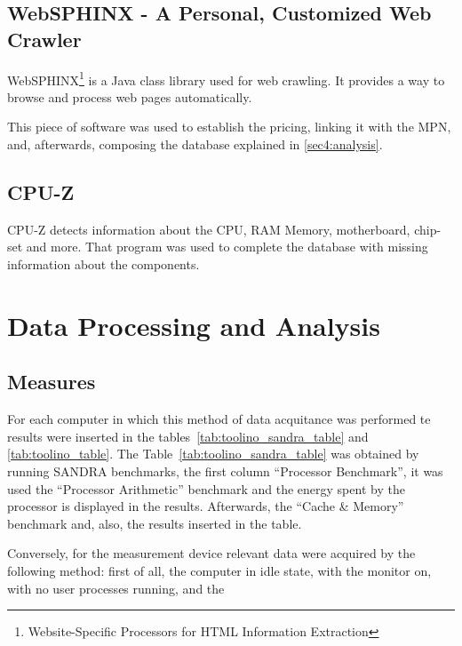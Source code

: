         
    
    \subsection{WebSPHINX - A Personal, Customized Web Crawler} \label{sec3:websphinx}
        WebSPHINX\footnote{Website-Specific Processors for HTML Information Extraction} is a Java class library used for web crawling. It provides a way to browse and process web pages automatically.
        
        This piece of software was used to establish the pricing, linking it with the MPN, and, afterwards, composing the database explained in \ref{sec4:analysis}. 
    
    \subsection{CPU-Z} \label{sec3:cpu-z}
        CPU-Z detects information about the CPU, RAM Memory, motherboard, chip-set and more. That program was used to complete the database with missing information about the components.

\section{Data Processing and Analysis} \label{sec3:data_processing_analysis}
    
    \subsection{Measures}\label{sec3:measures}
        For each computer in which this method of data acquitance was performed te results were inserted in the tables~\ref{tab:toolino_sandra_table} and \ref{tab:toolino_table}. The Table~\ref{tab:toolino_sandra_table} was obtained by running SANDRA benchmarks, the first column ``Processor Benchmark'', it was used the ``Processor Arithmetic'' benchmark and the energy spent by the processor is displayed in the results. Afterwards, the ``Cache \& Memory'' benchmark and, also, the results inserted in the table.
        
    Conversely, for the measurement device relevant data were acquired by the following method: first of all, the computer in idle state, with the monitor on, with no user processes running, and the 
    
